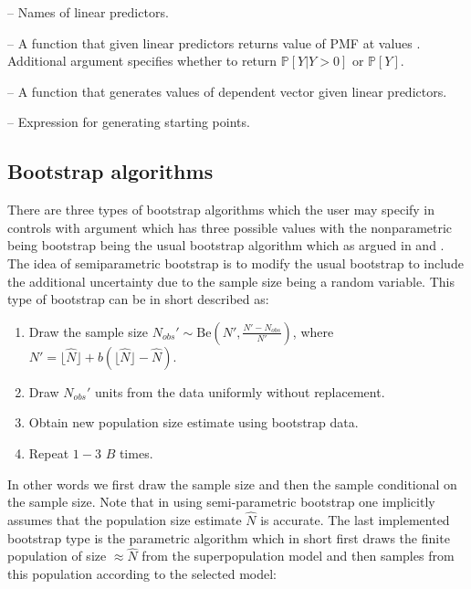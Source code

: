 \documentclass[
]{jss}
\newcommand{\1}{\mathcal{I}} \newcommand{\bx}{\boldsymbol{x}}
\begin{document}
{  \item {} -- Names of linear predictors.
  \item {} -- A function that given linear predictors returns value of PMF at values . Additional argument  specifies whether to return $\mathbb{P}[Y|Y>0]$ or $\mathbb{P}[Y]$.
  \item {} -- A function that generates values of dependent  vector given linear predictors.
  \item {} -- Expression for generating starting points.
}

\subsection{Bootstrap algorithms}\label{bootstrap-algorithms}

There are three types of bootstrap algorithms which the user may specify
in  controls with  argument which has
three possible values
 with the
nonparametric being bootstrap being the usual bootstrap algorithm which
as argued in \cite{norrpoll} and \cite{zwane}. The idea of
semiparametric bootstrap is to modify the usual bootstrap to include the
additional uncertainty due to the sample size being a random variable.
This type of bootstrap can be in short described as:

\begin{enumerate}
    \item Draw the sample size $N_{obs}'\sim\text{Be}\left(N', \frac{N'-N_{obs}}{N'}\right)$, where $N'=\lfloor\hat{N}\rfloor+b\left(\lfloor\hat{N}\rfloor-\hat{N}\right)$.
    \item Draw $N_{obs}'$ units from the data uniformly without replacement.
    \item Obtain new population size estimate using bootstrap data.
    \item Repeat $1-3$ $B$ times.
\end{enumerate}

In other words we first draw the sample size and then the sample
conditional on the sample size. Note that in using semi-parametric
bootstrap one implicitly assumes that the population size estimate
\(\hat{N}\) is accurate. The last implemented bootstrap type is the
parametric algorithm which in short first draws the finite population of
size \(\approx\hat{N}\) from the superpopulation model and then samples
from this population according to the selected model:
\end{document}
